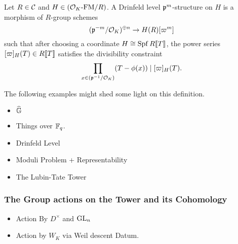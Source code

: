 \label{subsub:Deformations of Formal Modules with Drinfeld Level Structure}
\begin{defi}
  Let $R \in \mathcal{C}$ and $H \in {({\mathcal{O}_K}\text-\allowbreak\mathrm{FM}/{R})}$. A Drinfeld level 
  $\mathfrak{p}^m$-structure on $H$ is a morphism of $R$-group schemes 
  \begin{equation*}
    (\mathfrak{p}^{-m}/\mathcal{O}_K)^{\oplus n} \to H(R)[\varpi^m]
  \end{equation*}
  such that after choosing a coordinate $H \cong \operatorname{Spf} R\llbracket T \rrbracket$, the 
  power series $[\varpi]_H(T) \in R\llbracket T \rrbracket$ satisfies the divisibility constraint
  \begin{equation*}
    \prod_{x \in (\mathfrak{p}^{-1}/\mathcal{O}_K)}(T - \phi(x)) \mid  [\varpi]_H(T).
  \end{equation*}
\end{defi}
The following examples might shed some light on this definition.
\begin{xpl}
  \begin{itemize}
    \item $\widehat{\mathbb{G}}$
    \item Things over $\mathbb{F}_q$.
  \end{itemize}
\end{xpl}

\begin{itemize}
  \item Drinfeld Level
  \item Moduli Problem + Representability
  \item The Lubin-Tate Tower
\end{itemize}

\subsubsection{The Group actions on the Tower and its Cohomology} %
\label{subsub:The Group actions on the Tower}
\begin{itemize}
  \item Action By $D^\times$ and $\operatorname{GL}_n$
  \item Action by $W_K$ via Weil descent Datum.
\end{itemize}
